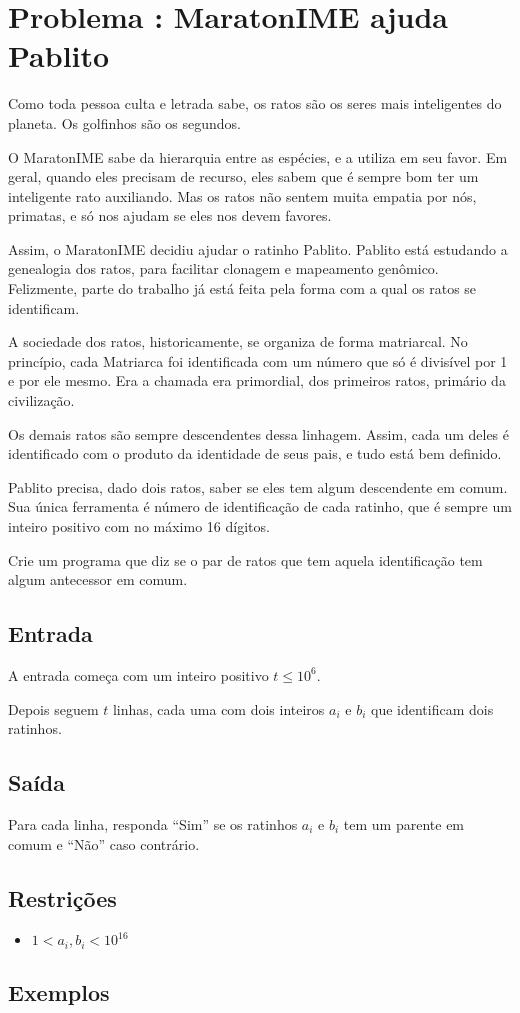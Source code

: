 \section*{Problema \proxLetra: MaratonIME ajuda Pablito}

Como toda pessoa culta e letrada sabe, os ratos são os seres mais inteligentes
do planeta. Os golfinhos são os segundos.

O MaratonIME sabe da hierarquia entre as espécies, e a utiliza em seu favor.
Em geral, quando eles precisam de recurso, eles sabem que é sempre bom ter um
inteligente rato auxiliando. Mas os ratos não sentem muita empatia por nós,
primatas, e só nos ajudam se eles nos devem favores.

Assim, o MaratonIME decidiu ajudar o ratinho Pablito. Pablito está estudando a
genealogia dos ratos, para facilitar clonagem e mapeamento genômico. Felizmente,
parte do trabalho já está feita pela forma com a qual os ratos se identificam.

A sociedade dos ratos, historicamente, se organiza de forma matriarcal. No princípio,
cada Matriarca foi identificada com um número que só é divisível por 1 e por ele mesmo.
Era a chamada era primordial, dos primeiros ratos, primário da civilização.

Os demais ratos são sempre descendentes dessa linhagem. Assim, cada um deles é
identificado com o produto da identidade de seus pais, e tudo está bem definido.

Pablito precisa, dado dois ratos, saber se eles tem algum descendente em comum.
Sua única ferramenta é número de identificação de cada ratinho, que é sempre um
inteiro positivo com no máximo 16 dígitos.

Crie um programa que diz se o par de ratos que tem aquela identificação tem algum
antecessor em comum.

\subsection*{Entrada}
\textoDiversasInstanciasEOF

A entrada começa com um inteiro positivo $t \leq 10^6$.

Depois seguem $t$ linhas, cada uma com dois inteiros $a_i$ e $b_i$ que identificam dois ratinhos.
\subsection*{Saída}

Para cada linha, responda ``Sim'' se os ratinhos $a_i$ e $b_i$ tem um parente em comum e ``Não'' caso contrário.


\subsection*{Restrições}

\begin{itemize}
    \item $1 < a_i, b_i < 10^16$
\end{itemize}

\subsection*{Exemplos}
